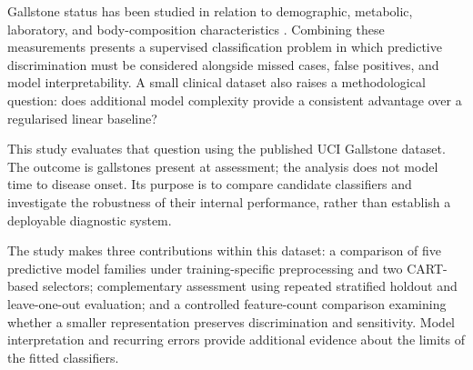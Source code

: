 Gallstone status has been studied in relation to demographic, metabolic, laboratory, and body-composition characteristics \parencite{lammert2016gallstones,esen2024early}. Combining these measurements presents a supervised classification problem in which predictive discrimination must be considered alongside missed cases, false positives, and model interpretability. A small clinical dataset also raises a methodological question: does additional model complexity provide a consistent advantage over a regularised linear baseline?

This study evaluates that question using the published UCI Gallstone dataset. The outcome is gallstones present at assessment; the analysis does not model time to disease onset. Its purpose is to compare candidate classifiers and investigate the robustness of their internal performance, rather than establish a deployable diagnostic system.

The study makes three contributions within this dataset: a comparison of five predictive model families under training-specific preprocessing and two CART-based selectors; complementary assessment using repeated stratified holdout and leave-one-out evaluation; and a controlled feature-count comparison examining whether a smaller representation preserves discrimination and sensitivity. Model interpretation and recurring errors provide additional evidence about the limits of the fitted classifiers.
